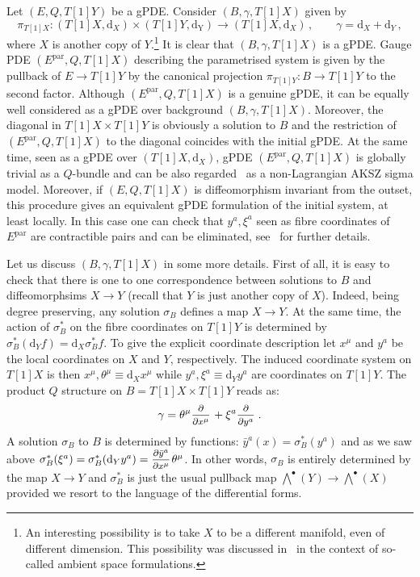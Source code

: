 \documentclass[a4paper,12pt]{article}
\numberwithin{equation}{section} %
\newcommand{\dx}{\mathrm{d}_X}
\newcommand{\dy}{\mathrm{d}_Y}
\renewcommand{\d}{\partial}
\newcommand{\ffrac}[2]{\raisebox{.5pt}%
  {\footnotesize$\displaystyle\frac{#1}{#2}$}\kern1pt}
\newcommand{\dl}[1]{\mathchoice{\ffrac{\d}{\d #1}}{\frac{\d}{\d #1}}{\ffrac{\d}{\d #1}}{\ffrac{\d}{\d #1}}}
\newcommand{\ddl}[2]{\ffrac{\d #1}{\d #2}}
\begin{document}
Let $(E,Q,T[1]Y)$ be a gPDE. Consider $(B,\gamma,T[1]X)$ given by
\begin{equation}
\pi_{T[1]X}:(T[1]X,\dx)\times (T[1]Y,\mathrm{d_{Y}}) \to (T[1]X,\dx)\,, \qquad \gamma=\dx+\dy \,,
\end{equation}
where $X$ is another copy of $Y$.\footnote{An interesting possibility is to take $X$ to be a different manifold, even of different dimension. This possibility was discussed in~\cite{Bekaert:2012vt} in the context of so-called ambient space formulations.} It is clear that $(B,\gamma,T[1]X)$ is a gPDE. Gauge PDE $(E^{\mathrm{par}},Q,T[1]X)$ describing the parametrised system is given by the pullback of $E \to T[1]Y$ by the canonical projection $\pi_{T[1]Y}:B\to T[1]Y$ to the second factor. Although $(E^{\mathrm{par}},Q,T[1]X)$ is a genuine gPDE, it can be equally well considered as a gPDE over background $(B,\gamma,T[1]X)$. Moreover, the diagonal in $T[1]X \times T[1]Y$ is obviously a solution to $B$ and the restriction of $(E^{\mathrm{par}},Q,T[1]X)$ to the diagonal coincides with the initial gPDE. At the same time, seen as a gPDE over $(T[1]X,\dx)$, gPDE $(E^{\mathrm{par}},Q,T[1]X)$ is globally trivial as a $Q$-bundle and can be also regarded~\cite{Barnich:2010sw} as a non-Lagrangian AKSZ sigma model. Moreover, if $(E,Q,T[1]X)$ is diffeomorphism invariant from the outset, this procedure gives an equivalent gPDE formulation of the initial system, at least locally. In this case one can check that $y^a,\xi^a$ seen as fibre coordinates of $E^{\mathrm{par}}$ are contractible pairs and can be eliminated, see~\cite{Grigoriev:2019ojp,Barnich:2010sw} for further details.


Let us discuss $(B,\gamma,T[1]X)$ in some more details. First of all, it is easy to check that there is one to one correspondence between solutions to $B$ and diffeomorphsims $X\to Y$ (recall that $Y$ is just another copy of $X$). Indeed, being degree preserving, any solution $\sigma_B$ defines a map $X\to Y$. At the same time, the action of $\sigma_B^*$ on the fibre coordinates on $T[1]Y$ is determined by $\sigma_B^*(\dy f)= \dx \sigma_B^* f$. To give the explicit coordinate description let $x^\mu$ and $y^a$ be the local coordinates on $X$ and $Y$, respectively. The induced coordinate system on $T[1]X$ is then $x^\mu,\theta^\mu\equiv \dx x^\mu$ while $y^a,\xi^a\equiv \dy y^a$ are coordinates on $T[1]Y$. The product $Q$ structure on $B=T[1]X\times T[1]Y$ reads as:
\begin{equation}
\gamma=\theta^\mu \dl{x^\mu}+\xi^a \dl{y^a}\,.
\end{equation}
 A solution $\sigma_B$ to $B$ is determined by functions:  $\bar y^a(x)=\sigma_B^*(y^a)$ and as we saw above $\sigma_B^*(\xi^a)=\sigma_B^*(\dy y^a)=\ddl{\bar y^a}{x^\mu}\theta^\mu$. In other words, $\sigma_B$ is entirely determined by the map $X\to Y$ and $\sigma^*_B$ is just the usual pullback map $\bigwedge^\bullet(Y) \to \bigwedge^\bullet(X)$ provided we resort to the language of the differential forms.  
 
\end{document}
